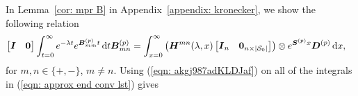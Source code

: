 In Lemma~\ref{cor: mpr B} in Appendix~\ref{appendix: kronecker}, we show the following relation
\begin{align}
	\vligne{\bs I & \bs 0 }\int_{t=0}^\infty e^{-\lambda t} e^{\bs{B}^{(p)}_{mm}t} \wrt t \bs{B}^{(p)}_{m{n}} %
	&= \int_{x=0}^\infty \left(\bs H^{mn}(\lambda,x) \vligne{\bs I_n & \bs 0_{n\times |\calS_0|}}\right) \otimes  e^{\bs S^{(p)} x}\bs D^{(p)}\wrt x, \label{eqn: akgj987adKLDJaf}
\end{align}
for \(m,n\in\{+,-\}\), \(m\neq n\). Using (\ref{eqn: akgj987adKLDJaf}) on all of the integrals in (\ref{eqn: approx end conv lst}) gives
